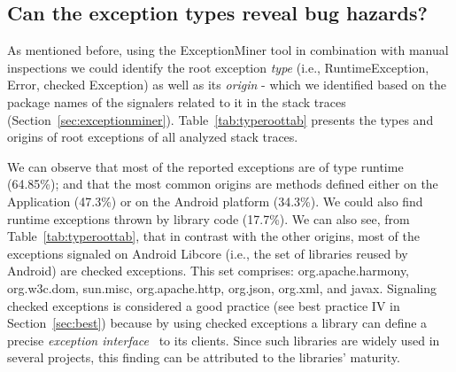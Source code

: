 

\subsection{Can the exception types reveal bug hazards?}

As mentioned before, using the ExceptionMiner tool in combination with manual inspections we could identify
the root exception \emph{type} (i.e., RuntimeException, Error, checked Exception) as well as its \emph{origin} - which we 
identified based on the package names of the signalers related to it in the stack traces (Section~\ref{sec:exceptionminer}).
Table~\ref{tab:typeroottab} presents the types and origins of root exceptions of all analyzed stack traces. 

We can observe that most of the reported exceptions are of type runtime 
(64.85\%); and that the most common origins are methods defined either on the Application (47.3\%)
or on the Android platform (34.3\%). We could also find runtime exceptions thrown by library code (17.7\%).
 We can also see, from Table~\ref{tab:typeroottab}, that in contrast with the other origins, most of the 
 exceptions signaled on Android Libcore (i.e., the set of libraries reused by Android) are 
checked exceptions. This set comprises: org.apache.harmony, org.w3c.dom, sun.misc, 
org.apache.http, org.json, org.xml, and javax. Signaling checked exceptions is considered a 
good practice (see best practice IV in Section~\ref{sec:best}) because by using 
checked exceptions a library can define a precise 
\emph{exception interface}~\cite{miller1997issues} to its clients.
 Since such libraries are widely used  in several projects, this
 finding can be attributed to the libraries' maturity.

